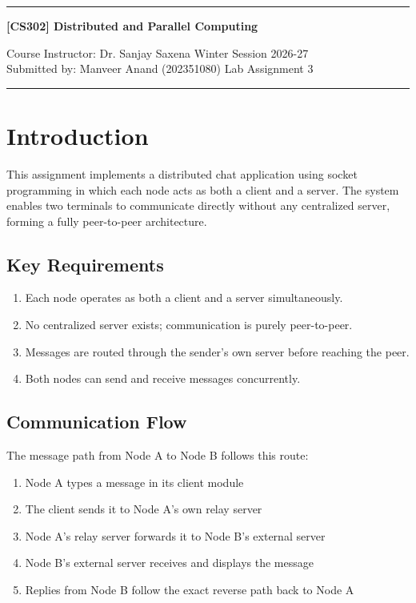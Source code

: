 \documentclass[11pt]{article}
\begin{document}
\noindent
\rule{\textwidth}{1pt}
\begin{center}
{\bf [CS302] Distributed and Parallel Computing}
\end{center}
Course Instructor: Dr. Sanjay Saxena \hfill Winter Session 2026-27\\
Submitted by: Manveer Anand (202351080) \hfill Lab Assignment 3
\\
\rule{\textwidth}{1pt}

\tableofcontents
\newpage 

\section{Introduction}
This assignment implements a distributed chat application using socket programming in which each node acts as both a client and a server. The system enables two terminals to communicate directly without any centralized server, forming a fully peer-to-peer architecture.

\subsection{Key Requirements}
\begin{enumerate}
    \item Each node operates as both a client and a server simultaneously.
    \item No centralized server exists; communication is purely peer-to-peer.
    \item Messages are routed through the sender's own server before reaching the peer.
    \item Both nodes can send and receive messages concurrently.
\end{enumerate}

\subsection{Communication Flow}
The message path from Node A to Node B follows this route:
\begin{enumerate}
    \item Node A types a message in its client module
    \item The client sends it to Node A's own relay server
    \item Node A's relay server forwards it to Node B's external server
    \item Node B's external server receives and displays the message
    \item Replies from Node B follow the exact reverse path back to Node A
\end{enumerate}
\end{document}
